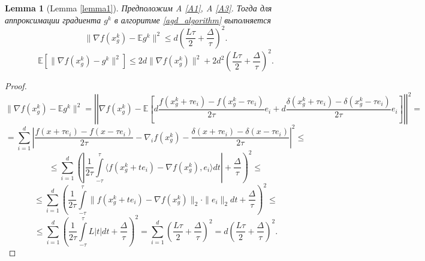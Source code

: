 \documentclass{article}
\newtheorem{lemma}{Lemma}
\begin{document}
\newpage
\appendix
\begin{lemma}[Lemma \ref{lemma1}]\label{lemma1_appendix}
 Предположим A \ref{A1}, A \ref{A3}. Тогда для аппроксимации градиента $g^k$ в алгоритме \ref{agd_algorithm} выполняется
 \begin{equation}
  \|\nabla f(x_g^k) - \mathbb{E}g^k\|^2 \leqslant d \left(\frac{L\tau}{2} + \frac{\Delta}{\tau}\right)^2.
  \label{norm_of_expectation_appendix}
 \end{equation}
 \begin{equation}
  \mathbb{E}[\|\nabla f(x_g^k) - g^k\|^2] \leqslant 2d \|\nabla f(x_g^k)\|^2 + 2 d^2 \left(\frac{L\tau}{2} + \frac{\Delta}{\tau}\right)^2.
  \label{expectation_of_norm_appendix}
 \end{equation}
\end{lemma}
\begin{proof}
  $$\|\nabla f(x_g^k) - \mathbb{E} g^k\|^2 = \left|\left| \nabla f(x_g^k) - \mathbb{E}\left[d\frac{f(x_g^k + \tau e_i) - f(x_g^k - \tau e_i)}{2\tau} e_i + d\frac{\delta(x_g^k + \tau e_i) - \delta(x_g^k - \tau e_i)}{2\tau} e_i\right]\right|\right|^2 = $$
  $$=\sum\limits_{i = 1}^d \left|\frac{f(x + \tau e_i) - f(x - \tau e_i)}{2\tau} - \nabla_i f(x_g^k) - \frac{\delta(x + \tau e_i) - \delta(x - \tau e_i)}{2\tau}\right|^2 \leqslant$$
  $$\leqslant \sum\limits_{i = 1}^d\left( \left|\frac{1}{2\tau} \int\limits_{-\tau}^\tau \langle f(x_g^k + t e_i) - \nabla f(x_g^k), e_i \rangle dt\right| + \frac{\Delta}{\tau}\right)^2 \leqslant$$
  $$\leqslant \sum\limits_{i = 1}^d\left( \frac{1}{2\tau} \int\limits_{-\tau}^\tau \|f(x_g^k + t e_i) - \nabla f(x_g^k)\|_2 \cdot \|e_i\|_2 dt + \frac{\Delta}{\tau}\right)^2 \leqslant$$
  $$\leqslant \sum\limits_{i = 1}^d\left( \frac{1}{2\tau} \int\limits_{-\tau}^\tau L |t| dt + \frac{\Delta}{\tau}\right)^2 = \sum\limits_{i = 1}^d\left( \frac{L\tau}{2} + \frac{\Delta}{\tau} \right)^2 = d \left(\frac{L\tau}{2} + \frac{\Delta}{\tau}\right)^2.$$


\end{proof}
\end{document}
